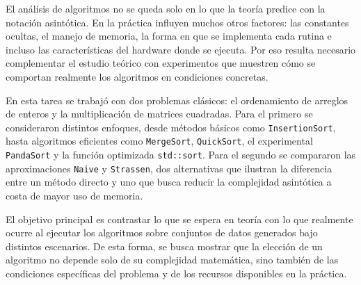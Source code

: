 El análisis de algoritmos no se queda solo en lo que la teoría predice con la notación asintótica. 
En la práctica influyen muchos otros factores: las constantes ocultas, el manejo de memoria, 
la forma en que se implementa cada rutina e incluso las características del hardware donde se ejecuta. 
Por eso resulta necesario complementar el estudio teórico con experimentos que muestren cómo se comportan realmente los algoritmos en condiciones concretas.

En esta tarea se trabajó con dos problemas clásicos: el ordenamiento de arreglos de enteros y la multiplicación de matrices cuadradas. 
Para el primero se consideraron distintos enfoques, desde métodos básicos como \texttt{InsertionSort}, 
hasta algoritmos eficientes como \texttt{MergeSort}, \texttt{QuickSort}, el experimental \texttt{PandaSort} y la función optimizada \texttt{std::sort}. 
Para el segundo se compararon las aproximaciones \texttt{Naive} y \texttt{Strassen}, 
dos alternativas que ilustran la diferencia entre un método directo y uno que busca reducir la complejidad asintótica a costa de mayor uso de memoria.

El objetivo principal es contrastar lo que se espera en teoría con lo que realmente ocurre al ejecutar los algoritmos sobre conjuntos de datos generados bajo distintos escenarios. 
De esta forma, se busca mostrar que la elección de un algoritmo no depende solo de su complejidad matemática, 
sino también de las condiciones específicas del problema y de los recursos disponibles en la práctica.
